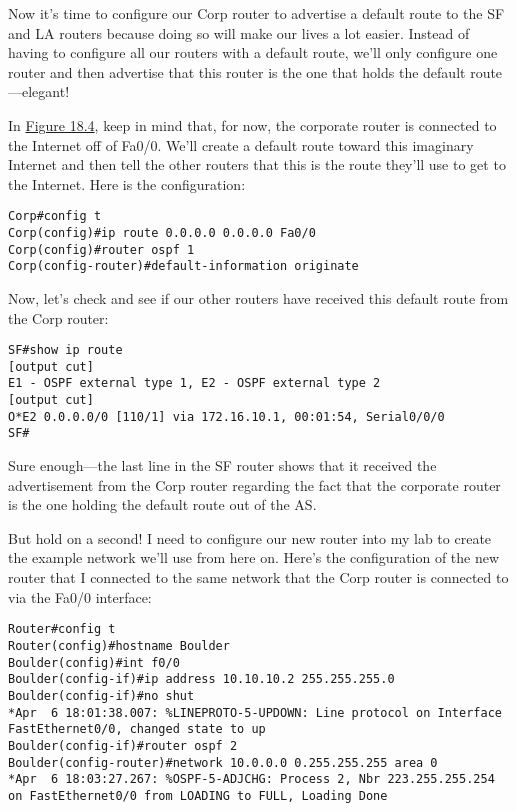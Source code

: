\protect\hypertarget{c18.xhtmlux5cux23Page_761}{}{}Now it's time to
configure our Corp router to advertise a default route to the SF and LA
routers because doing so will make our lives a lot easier. Instead of
having to configure all our routers with a default route, we'll only
configure one router and then advertise that this router is the one that
holds the default route---elegant!

In \protect\hyperlink{c18.xhtmlux5cux23figure18-4}{Figure 18.4}, keep in
mind that, for now, the corporate router is connected to the Internet
off of Fa0/0. We'll create a default route toward this imaginary
Internet and then tell the other routers that this is the route they'll
use to get to the Internet. Here is the configuration:

\begin{verbatim}
Corp#config t
Corp(config)#ip route 0.0.0.0 0.0.0.0 Fa0/0
Corp(config)#router ospf 1
Corp(config-router)#default-information originate
\end{verbatim}

Now, let's check and see if our other routers have received this default
route from the Corp router:

\begin{verbatim}
SF#show ip route
[output cut]
E1 - OSPF external type 1, E2 - OSPF external type 2
[output cut]
O*E2 0.0.0.0/0 [110/1] via 172.16.10.1, 00:01:54, Serial0/0/0
SF#
\end{verbatim}

Sure enough---the last line in the SF router shows that it received the
advertisement from the Corp router regarding the fact that the corporate
router is the one holding the default route out of the AS.

But hold on a second! I need to configure our new router into my lab to
create the example network we'll use from here on. Here's the
configuration of the new router that I connected to the same network
that the Corp router is connected to via the Fa0/0 interface:

\begin{verbatim}
Router#config t
Router(config)#hostname Boulder
Boulder(config)#int f0/0
Boulder(config-if)#ip address 10.10.10.2 255.255.255.0
Boulder(config-if)#no shut
*Apr  6 18:01:38.007: %LINEPROTO-5-UPDOWN: Line protocol on Interface FastEthernet0/0, changed state to up
Boulder(config-if)#router ospf 2
Boulder(config-router)#network 10.0.0.0 0.255.255.255 area 0
*Apr  6 18:03:27.267: %OSPF-5-ADJCHG: Process 2, Nbr 223.255.255.254 on FastEthernet0/0 from LOADING to FULL, Loading Done
\end{verbatim}

